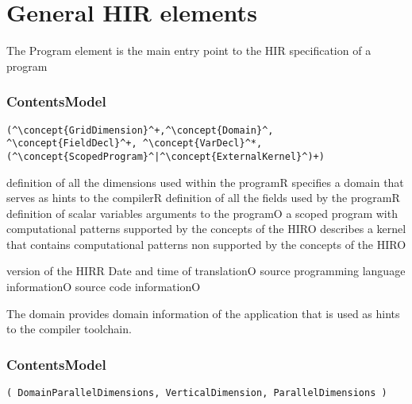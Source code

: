 \section{General HIR elements}


The Program element is the main entry point to the HIR
specification of a program

\subsubsection*{ContentsModel}{}

\begin{lstlisting}[style=default,frame=none]
(^\concept{GridDimension}^+,^\concept{Domain}^, ^\concept{FieldDecl}^+, ^\concept{VarDecl}^*, (^\concept{ScopedProgram}^|^\concept{ExternalKernel}^)+)
\end{lstlisting}

\begin{HIRChildElements}
{definition of all the dimensions used within the program}{R}
{specifies a domain that serves as hints to the compiler}{R}
{definition of all the fields used by the program}{R}
{definition of scalar variables arguments to the program}{O}
{a scoped program with computational patterns supported by the concepts of the HIR}{O}
{describes a kernel that contains computational patterns non supported by the concepts of the HIR}{O}
\end{HIRChildElements}

\begin{HIRAttributes}
{version of the HIR}{R}
{Date and time of translation}{O}
{source programming language information}{O}
{source code information}{O}
\end{HIRAttributes}


The domain provides domain information of the application that is used as hints to the compiler toolchain.

\subsubsection*{ContentsModel}{}

\begin{lstlisting}[style=default,frame=none]
( DomainParallelDimensions, VerticalDimension, ParallelDimensions )
\end{lstlisting}

